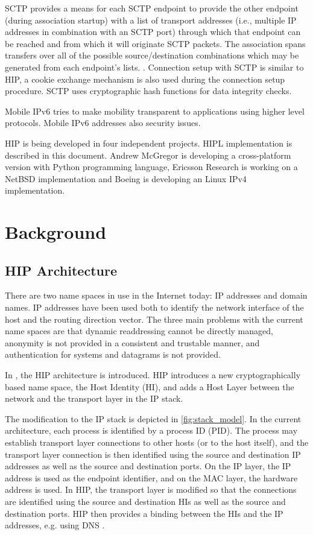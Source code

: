 SCTP provides a means for each SCTP endpoint to provide the other
endpoint (during association startup) with a list of transport
addresses (i.e., multiple IP addresses in combination with an SCTP
port) through which that endpoint can be reached and from which it
will originate SCTP packets. The association spans transfers over all
of the possible source/destination combinations which may be generated
from each endpoint's lists. \cite{rfc2960}. Connection setup with SCTP
is similar to HIP, a cookie exchange mechanism is also used during the
connection setup procedure. SCTP uses cryptographic hash functions for
data integrity checks.

Mobile IPv6 tries to make mobility transparent to applications using
higher level protocols. Mobile IPv6 \cite{rfc2002} addresses also
security issues.

HIP is being developed in four independent projects. HIPL
implementation is described in this document. Andrew McGregor is
developing a cross-platform version \cite{pyhip} with Python
programming language, Ericsson Research \cite{ericsson} is working on
a NetBSD implementation \cite{netbsd} and Boeing \cite{boeing} is
developing an Linux IPv4 implementation.

\section{Background}
\label{sec:background}

\subsection{HIP Architecture}

There are two name spaces in use in the Internet today: IP addresses
and domain names.  IP addresses have been used both to identify the
network interface of the host and the routing direction vector.  The
three main problems with the current name spaces are that dynamic
readdressing cannot be directly managed, anonymity is not provided in
a consistent and trustable manner, and authentication for systems and
datagrams is not provided.

In \cite{hiparch} , the HIP architecture is introduced. HIP introduces
a new cryptographically based name space, the Host Identity (HI), and
adds a Host Layer between the network and the transport layer in the
IP stack.

The modification to the IP stack is depicted in
\autoref{fig:stack_model}. In the current architecture, each process
is identified by a process ID (PID). The process may establish
transport layer connections to other hosts (or to the host itself),
and the transport layer connection is then identified using the source
and destination IP addresses as well as the source and destination
ports. On the IP layer, the IP address is used as the endpoint
identifier, and on the MAC layer, the hardware address is used. In
HIP, the transport layer is modified so that the connections are
identified using the source and destination HIs as well as the source
and destination ports.  HIP then provides a binding between the HIs
and the IP addresses, e.g. using DNS \cite{rfc1034}.

